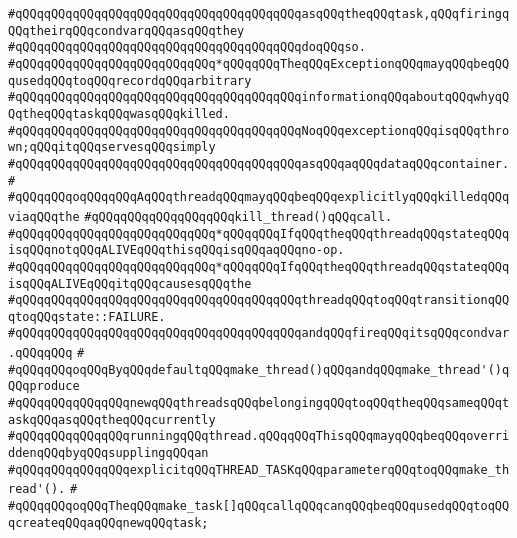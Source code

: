 \verb|#qQQqqQQqqQQqqQQqqQQqqQQqqQQqqQQqqQQqqQQqasqQQqtheqQQqtask,qQQqfiringqQQqtheirqQQqcondvarqQQqasqQQqthey|\newline
\verb|#qQQqqQQqqQQqqQQqqQQqqQQqqQQqqQQqqQQqqQQqdoqQQqso.|\newline
\verb|#qQQqqQQqqQQqqQQqqQQqqQQqqQQq*qQQqqQQqTheqQQqExceptionqQQqmayqQQqbeqQQqusedqQQqtoqQQqrecordqQQqarbitrary|\newline
\verb|#qQQqqQQqqQQqqQQqqQQqqQQqqQQqqQQqqQQqqQQqinformationqQQqaboutqQQqwhyqQQqtheqQQqtaskqQQqwasqQQqkilled.|\newline
\verb|#qQQqqQQqqQQqqQQqqQQqqQQqqQQqqQQqqQQqqQQqNoqQQqexceptionqQQqisqQQqthrown;qQQqitqQQqservesqQQqsimply|\newline
\verb|#qQQqqQQqqQQqqQQqqQQqqQQqqQQqqQQqqQQqqQQqasqQQqaqQQqdataqQQqcontainer.|\newline
\verb|#|\newline
\verb|#qQQqqQQqoqQQqqQQqAqQQqthreadqQQqmayqQQqbeqQQqexplicitlyqQQqkilledqQQqviaqQQqthe|\newline
\verb|#qQQqqQQqqQQqqQQqqQQqkill_thread()qQQqcall.|\newline
\verb|#qQQqqQQqqQQqqQQqqQQqqQQqqQQq*qQQqqQQqIfqQQqtheqQQqthreadqQQqstateqQQqisqQQqnotqQQqALIVEqQQqthisqQQqisqQQqaqQQqno-op.|\newline
\verb|#qQQqqQQqqQQqqQQqqQQqqQQqqQQq*qQQqqQQqIfqQQqtheqQQqthreadqQQqstateqQQqisqQQqALIVEqQQqitqQQqcausesqQQqthe|\newline
\verb|#qQQqqQQqqQQqqQQqqQQqqQQqqQQqqQQqqQQqqQQqthreadqQQqtoqQQqtransitionqQQqtoqQQqstate::FAILURE.|\newline
\verb|#qQQqqQQqqQQqqQQqqQQqqQQqqQQqqQQqqQQqqQQqandqQQqfireqQQqitsqQQqcondvar.qQQqqQQq|\newline
\verb|#|\newline
\verb|#qQQqqQQqoqQQqByqQQqdefaultqQQqmake_thread()qQQqandqQQqmake_thread'()qQQqproduce|\newline
\verb|#qQQqqQQqqQQqqQQqnewqQQqthreadsqQQqbelongingqQQqtoqQQqtheqQQqsameqQQqtaskqQQqasqQQqtheqQQqcurrently|\newline
\verb|#qQQqqQQqqQQqqQQqrunningqQQqthread.qQQqqQQqThisqQQqmayqQQqbeqQQqoverriddenqQQqbyqQQqsupplingqQQqan|\newline
\verb|#qQQqqQQqqQQqqQQqexplicitqQQqTHREAD_TASKqQQqparameterqQQqtoqQQqmake_thread'().|\newline
\verb|#|\newline
\verb|#qQQqqQQqoqQQqTheqQQqmake_task[]qQQqcallqQQqcanqQQqbeqQQqusedqQQqtoqQQqcreateqQQqaqQQqnewqQQqtask;|\newline
